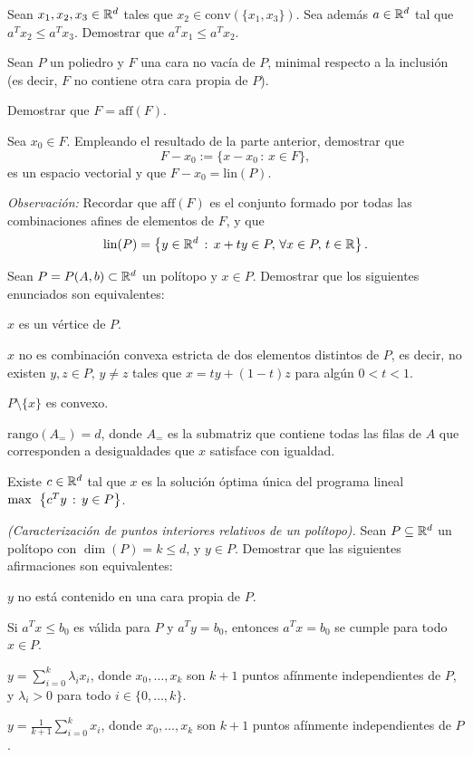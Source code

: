 \documentclass[a4paper,12pt]{article}
\newcommand{\lineal}[1]{\mbox{lin}(#1)}
\renewcommand{\conv}[1]{\mathrm{conv}\left(#1\right)}
\newcommand{\aff}[1]{\mathrm{aff}\left(#1\right)}
\newcommand{\rango}[1]{\mathrm{rango}\left(#1\right)}
\begin{document}
\begin{exerciselist}
\item Sean $x_1, x_2, x_3 \in \mathbb{R}^d$ tales que $x_2 \in \conv{\{ x_1, x_3 \} }$. Sea además $a \in \mathbb{R}^d$ tal que $a^T x_2 \leq a^T x_3$. Demostrar que $a^T x_1 \leq a^T x_2$.

\item Sean $P$ un poliedro y $F$ una cara no vacía de $P$, minimal respecto a la inclusión (es decir, $F$ no contiene otra cara propia de $P$).

\begin{exerciselist}
\item Demostrar que $F = \aff{F}$.
\item Sea $x_0 \in F$. Empleando el resultado de la parte anterior, demostrar que
$$
F - x_0 := \{ x - x_0 \, : \, x \in F \},
$$
es un espacio vectorial y que $F - x_0 = \lineal{P}$.
\end{exerciselist}

\emph{Observación:} Recordar que $\aff{F}$ es el conjunto formado por todas las combinaciones afines de elementos de $F$, y que
$$
\lineal{P}= \setof{y \in \RR^d}{x + ty \in P, \, \forall x \in P, \, t \in \RR}.
$$

\item Sean $P=P(A,b) \subset \mathbb{R}^d$ un polítopo y $x \in P$. Demostrar que los siguientes enunciados son equivalentes:
\begin{exerciselist}
\item $x$ es un vértice de $P$.
\item $x$ no es combinación convexa estricta de dos elementos distintos de $P$,
es decir, no existen $y, z \in P$, $y \neq z$ tales que $x= ty + (1-t)z$ para algún
$0 < t <1$.
\item $P \setminus \{ x \}$ es convexo.
\item $\rango{A_{=}} = d$, donde $A_{=}$ es la submatriz que contiene todas
las filas de $A$ que corresponden a desigualdades que $x$ satisface con igualdad.
\item Existe $c \in \mathbb{R}^d$ tal que $x$ es la solución óptima única del programa
lineal $\mathop{\rm max\>\>}\left\{ c^T y \, : \, y \in P \right\}$.
\end{exerciselist}

\item \emph{(Caracterización de puntos interiores relativos de un polítopo).} Sean $P \subseteq \mathbb{R}^d$ un polítopo con $\dim(P)= k \leq d$, y $y \in P$. Demostrar que las siguientes afirmaciones son equivalentes:
\begin{exerciselist}
  \item $y$ no está contenido en una cara propia de $P$.
  \item Si $a^T x \leq b_0$ es válida para $P$ y $a^T y = b_0$, entonces $a^T x = b_0$ se cumple para todo $x \in P$.
  \item $y = \sum_{i=0}^{k} \lambda_i x_i$, donde $x_0, \ldots, x_k$ son $k+1$ puntos afínmente independientes de $P$, y $\lambda_i >0$ para todo $i \in \{0, \ldots, k\}$.
  \item $y = \frac{1}{k+1} \sum_{i=0}^{k} x_i$, donde $x_0, \ldots, x_k$ son $k+1$ puntos afínmente independientes de $P$.
\end{exerciselist}


\end{exerciselist}
\end{document}
